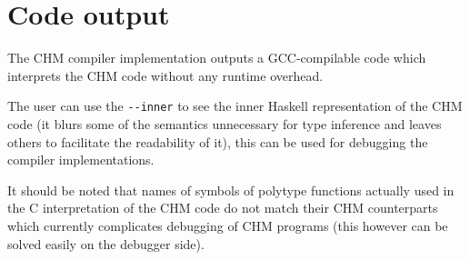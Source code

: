 \section{Code output}

The CHM compiler implementation outputs a GCC-compilable code which interprets the CHM code without any runtime overhead.

The user can use the \lstinline[language=sh]{--inner} to see the inner Haskell representation of the CHM code (it blurs some of the semantics unnecessary for type inference and leaves others to facilitate the readability of it), this can be used for debugging the compiler implementations.

It should be noted that names of symbols of polytype functions actually used in the C interpretation of the CHM code do not match their CHM counterparts which currently complicates debugging of CHM programs (this however can be solved easily on the debugger side).
